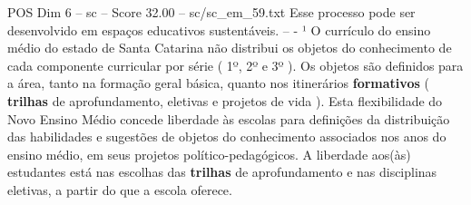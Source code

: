 \begin{textsample}{POS Dim 6 – sc – Score 32.00 – sc/sc\_em\_59.txt}
Esse processo pode ser desenvolvido em espaços educativos sustentáveis. -- - ¹ O currículo do ensino médio do estado de Santa Catarina não distribui os objetos do conhecimento de cada componente curricular por série ( 1º, 2º e 3º ).
Os objetos são definidos para a área, tanto na formação geral básica, quanto nos itinerários \textbf{formativos} ( \textbf{trilhas} de aprofundamento, eletivas e projetos de vida ).
Esta flexibilidade do Novo Ensino Médio concede liberdade às escolas para definições da distribuição das habilidades e sugestões de objetos do conhecimento associados nos anos do ensino médio, em seus projetos político-pedagógicos.
A liberdade aos(às) estudantes está nas escolhas das \textbf{trilhas} de aprofundamento e nas disciplinas eletivas, a partir do que a escola oferece.

\end{textsample}
